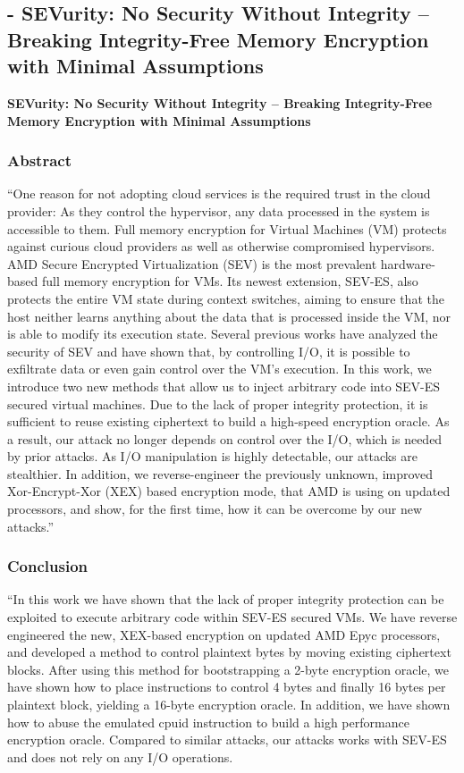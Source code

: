 
\subsection{\cite{wilke_sevurity_2020} - SEVurity: No Security Without Integrity -- Breaking Integrity-Free Memory Encryption with Minimal Assumptions }

\textbf{SEVurity: No Security Without Integrity -- Breaking Integrity-Free Memory 
Encryption with Minimal Assumptions} 

\subsubsection*{Abstract \cite{wilke_sevurity_2020}}
“One reason for not adopting cloud services is the required trust in the cloud provider: As they control the hypervisor, any data processed in the system is accessible to them. Full memory encryption for Virtual Machines (VM) protects against curious cloud providers as well as otherwise compromised hypervisors. AMD Secure Encrypted Virtualization (SEV) is the most prevalent hardware-based full memory encryption for VMs. Its newest extension, SEV-ES, also protects the entire VM state during context switches, aiming to ensure that the host neither learns anything about the data that is processed inside the VM, nor is able to modify its execution state. Several previous works have analyzed the security of SEV and have shown that, by controlling I/O, it is possible to exfiltrate data or even gain control over the VM’s execution. In this work, we introduce two new methods that allow us to inject arbitrary code into SEV-ES secured virtual machines. Due to the lack of proper integrity protection, it is sufficient to reuse existing ciphertext to build a high-speed encryption oracle. As a result, our attack no longer depends on control over the I/O, which is needed by prior attacks. As I/O manipulation is highly detectable, our attacks are stealthier. In addition, we reverse-engineer the previously unknown, improved Xor-Encrypt-Xor (XEX) based encryption mode, that AMD is using on updated processors, and show, for the first time, how it can be overcome by our new attacks.”

\subsubsection*{Conclusion \cite{wilke_sevurity_2020}}
“In this work we have shown that the lack of proper integrity protection can be exploited to execute arbitrary code within SEV-ES secured VMs. We have reverse engineered the new, XEX-based encryption on updated AMD Epyc processors, and developed a method to control plaintext bytes by moving existing ciphertext blocks. After using this method for bootstrapping a 2-byte encryption oracle, we have shown how to place instructions to control 4 bytes and finally 16 bytes per plaintext block, yielding a 16-byte encryption oracle. In addition, we have shown how to abuse the emulated cpuid instruction to build a high performance encryption oracle. Compared to similar attacks, our attacks works with SEV-ES and does not rely on any I/O operations.

